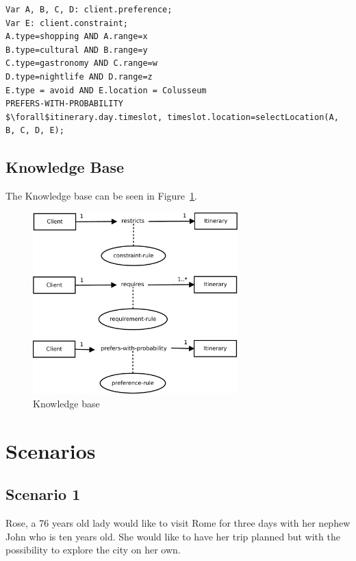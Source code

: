 \documentclass[11pt]{article} %
\begin{document}
\begin{lstlisting}[label=Rules,caption=The client expresses four preferences with four ranges (from 1 to 5). The method selectLocation will compose the itinerary selecting the locations that fits the preferences. For example it could select 3 shopping\, 1 gastronomy and 1 cultural locations.,breaklines=true,mathescape=true]
Var A, B, C, D: client.preference;
Var E: client.constraint;
A.type=shopping AND A.range=x
B.type=cultural AND B.range=y
C.type=gastronomy AND C.range=w
D.type=nightlife AND D.range=z
E.type = avoid AND E.location = Colusseum
PREFERS-WITH-PROBABILITY
$\forall$itinerary.day.timeslot, timeslot.location=selectLocation(A, B, C, D, E);
\end{lstlisting}

\subsection{Knowledge Base}

The Knowledge base can be seen in Figure~\ref{fig:knowledgebase}.

\begin{figure}[h]
\centering
\includegraphics[height=7cm]{images/knowledge_base.pdf}
\caption{Knowledge base}
\label{fig:knowledgebase}
\end{figure}



\section{Scenarios}

\subsection{Scenario 1}

Rose, a 76 years old lady would like to visit Rome for three days with her nephew John who is ten years old. She would like to have her trip planned but with the possibility to explore the city on her own. 
\end{document}
